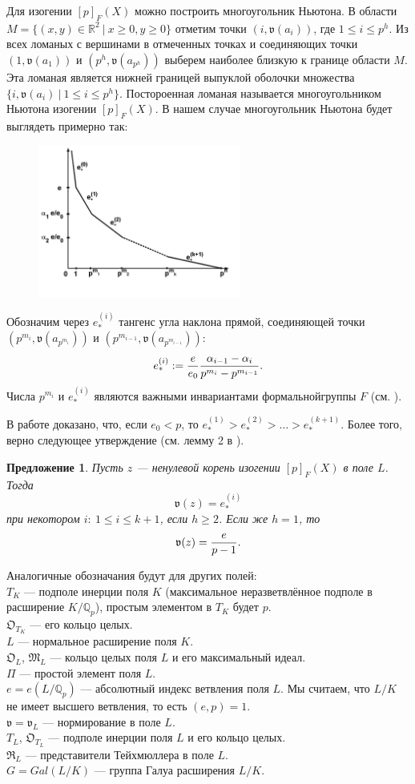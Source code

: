 \documentclass[a4paper]{article}
\newcommand{\Qp}{\mathbb{Q}_p}
\newcommand{\ML}{\mathfrak{M}_L}
\newcommand{\OTK}{\mathfrak{O}_{T_K}}
\newcommand{\OL}{\mathfrak{O}_L}
\newcommand{\OTL}{\mathfrak{O}_{T_L}}
\newcommand{\RL}{\mathfrak{R}_L}
\newcommand{\val}{\mathfrak{v}}
\newcommand{\Rb}{\mathbb{R}}
\newcommand{\Leq}{\leqslant}
\newcommand{\Geq}{\geqslant}
\newtheorem{proposition}{Предложение}
\begin{document}
Для изогении $[p]_F(X)$ можно построить многоугольник Ньютона. В области $M=\{(x,y)\in\Rb^2\ |\ x\Geq0,y\Geq0\}$ отметим точки $(i,\val(a_i))$, где $ 1\Leq i\Leq p^h$. Из всех ломаных с вершинами в отмеченных точках и соединяющих точки $(1,\val(a_1))$ и $(p^h,\val(a_{p^h}))$ выберем наиболее близкую к границе области $M$. Эта ломаная является нижней границей выпуклой оболочки множества $\{i,\val(a_i)\ |\ 1\Leq i\Leq p^h\}$. Постороенная ломаная называется многоугольником Ньютона изогении $[p]_F(X)$. В нашем случае многоугольник Ньютона будет выглядеть примерно так:
\begin{figure}[h]
	\centering	
		\includegraphics[height=5cm]{NewtonPolygon}
	\label{fig:Polygon}
\end{figure}

Обозначим через $e_*^{(i)}$ тангенс угла наклона прямой, соединяющей точки $(p^{m_i},\val(a_{p^{m_i}}))$ и $(p^{m_{i-1}},\val(a_{p^{m_{i-1}}}))$:
$$e_*^{(i)}:={e\over e_0}{\alpha_{i-1}-\alpha_{i}\over p^{m_i}-p^{m_{i-1}}}.$$
Числа $p^{m_i}$ и $e_*^{(i)}$ являются важными инвариантами формальной\linebreak группы $F$ (см. \cite{book4}).

В работе \cite{book2} доказано, что, если $e_0<p$, то $e_*^{(1)}>e_*^{(2)}>\dots>e_*^{(k+1)}$. Более того, верно следующее утверждение (см. лемму 2 в \cite{book2}).
\begin{proposition}
Пусть $z$ --- ненулевой корень изогении $[p]_F(X)$ в поле $L$. Тогда
$$\val(z)=e_*^{(i)}$$
при некотором $i:\ 1\Leq i\Leq k+1$, если $h\Geq2$. Если же $h=1$, то
$$\val(z)={e\over p-1}.$$
\end{proposition}
Аналогичные обозначания будут для других полей:\\
$T_K$ --- подполе инерции поля $K$ (максимальное неразветвлённое подполе в расширение $K/\Qp$), простым элементом в $T_K$ будет $p$.\\
$\OTK$ --- его кольцо целых.\\
$L$ --- нормальное расширение поля $K$.\\
$\OL$, $\ML$ --- кольцо целых поля $L$ и его максимальный идеал.\\
$\Pi$ --- простой элемент поля $L$.\\
$e=e(L/\Qp)$ --- абсолютный индекс ветвления поля $L$. Мы считаем, что $L/K$ не имеет высшего ветвления, то есть $(e,p)=1$.\\
$\val = \val_L$ --- нормирование в поле $L$.\\
$T_L$, $\OTL$ --- подполе инерции поля $L$ и его кольцо целых.\\
$\RL$ --- представители Тейхмюллера в поле $L$.\\
$G=Gal(L/K)$ --- группа Галуа расширения $L/K$.
\end{document}
